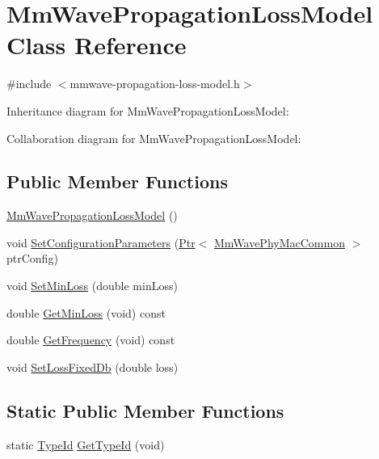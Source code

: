 \hypertarget{classMmWavePropagationLossModel}{}\section{Mm\+Wave\+Propagation\+Loss\+Model Class Reference}
\label{classMmWavePropagationLossModel}


{\ttfamily \#include $<$mmwave-\/propagation-\/loss-\/model.\+h$>$}



Inheritance diagram for Mm\+Wave\+Propagation\+Loss\+Model\+:


Collaboration diagram for Mm\+Wave\+Propagation\+Loss\+Model\+:
\subsection*{Public Member Functions}
\begin{DoxyCompactItemize}
\item 
\hyperlink{classMmWavePropagationLossModel_a693cbde0a0dd3775a7a0322233dc674e}{Mm\+Wave\+Propagation\+Loss\+Model} ()
\item 
void \hyperlink{classMmWavePropagationLossModel_a76485569a8351462f80c619d2f516bd3}{Set\+Configuration\+Parameters} (\hyperlink{classns3_1_1Ptr}{Ptr}$<$ \hyperlink{classns3_1_1MmWavePhyMacCommon}{Mm\+Wave\+Phy\+Mac\+Common} $>$ ptr\+Config)
\item 
void \hyperlink{classMmWavePropagationLossModel_a9d5cd23f54e442ff2de45f49c1804a67}{Set\+Min\+Loss} (double min\+Loss)
\item 
double \hyperlink{classMmWavePropagationLossModel_a88dc9a8dc35ab474d141ad00b94f3afc}{Get\+Min\+Loss} (void) const 
\item 
double \hyperlink{classMmWavePropagationLossModel_a9bfb6464ca4ea746e5bbd66367518c02}{Get\+Frequency} (void) const 
\item 
void \hyperlink{classMmWavePropagationLossModel_a4aad84a4e9ea27f827a62866ec0d8bca}{Set\+Loss\+Fixed\+Db} (double loss)
\end{DoxyCompactItemize}
\subsection*{Static Public Member Functions}
\begin{DoxyCompactItemize}
\item 
static \hyperlink{classns3_1_1TypeId}{Type\+Id} \hyperlink{classMmWavePropagationLossModel_a7a029033ebe8a731db5521a9db427ce0}{Get\+Type\+Id} (void)
\end{DoxyCompactItemize}
